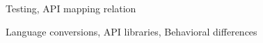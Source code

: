 \documentclass{sigplanconf}
\begin{document}
\terms
Testing, API mapping relation

\keywords
Language conversions, API libraries, Behavioral differences

%
%


%


%
%

\end{document}
